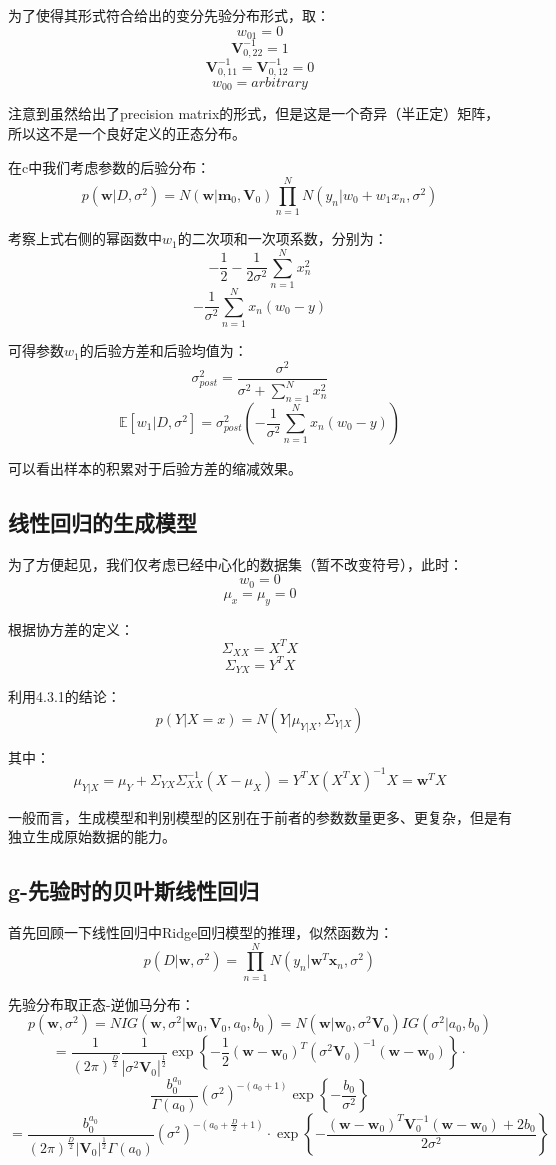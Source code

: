 \documentclass[UTF8]{ctexart}
\begin{document}
为了使得其形式符合给出的变分先验分布形式，取：
$$w_{01}=0$$
$$\textbf{V}_{0,22}^{-1}=1$$
$$\textbf{V}_{0,11}^{-1}=\textbf{V}_{0,12}^{-1}=0$$
$$w_{00}=arbitrary$$

注意到虽然给出了precision matrix的形式，但是这是一个奇异（半正定）矩阵，所以这不是一个良好定义的正态分布。

在c中我们考虑参数的后验分布：
$$p(\textbf{w}|D,\sigma^{2}) =N(\textbf{w}|\textbf{m}_{0},\textbf{V}_{0})\prod_{n=1}^{N}N(y_{n}|w_{0}+w_{1}x_{n},\sigma^{2})$$

考察上式右侧的幂函数中$w_{1}$的二次项和一次项系数，分别为：
$$-\frac{1}{2}-\frac{1}{2\sigma^{2}}\sum_{n=1}^{N}x_{n}^{2}$$
$$-\frac{1}{\sigma^{2}}\sum_{n=1}^{N}x_{n}(w_{0}-y)$$

可得参数$w_{1}$的后验方差和后验均值为：
$$\sigma^{2}_{post}=\frac{\sigma^{2}}{\sigma^{2}+\sum_{n=1}^{N}x_{n}^{2}}$$
$$\mathbb{E}[w_{1}|D,\sigma^{2}]=\sigma^{2}_{post}(-\frac{1}{\sigma^{2}}\sum_{n=1}^{N}x_{n}(w_{0}-y))$$

可以看出样本的积累对于后验方差的缩减效果。

\subsection{线性回归的生成模型}
为了方便起见，我们仅考虑已经中心化的数据集（暂不改变符号），此时：
$$w_{0}=0$$
$$\mu_{x}=\mu_{y}=0$$

根据协方差的定义：
$$\Sigma_{XX}=X^{T}X$$
$$\Sigma_{YX}=Y^{T}X$$

利用4.3.1的结论：
$$p(Y|X=x)=N(Y|\mu_{Y|X},\Sigma_{Y|X})$$

其中：
$$\mu_{Y|X}=\mu_{Y}+\Sigma_{YX}\Sigma_{XX}^{-1}(X-\mu_{X})=Y^{T}X(X^{T}X)^{-1}X=\textbf{w}^{T}X$$

一般而言，生成模型和判别模型的区别在于前者的参数数量更多、更复杂，但是有独立生成原始数据的能力。

\subsection{g-先验时的贝叶斯线性回归}
首先回顾一下线性回归中Ridge回归模型的推理，似然函数为：
$$p(D|\textbf{w},\sigma^{2})=\prod_{n=1}^{N}N(y_{n}|\textbf{w}^{T}\textbf{x}_{n},\sigma^{2})$$

先验分布取正态-逆伽马分布：
$$p(\textbf{w},\sigma^{2})=NIG(\textbf{w},\sigma^{2}|\textbf{w}_{0},\textbf{V}_{0},a_{0},b_{0})=N(\textbf{w}|\textbf{w}_{0},\sigma^{2}\textbf{V}_{0})IG(\sigma^{2}|a_{0},b_{0})$$
$$=\frac{1}{(2\pi)^{\frac{D}{2}}}\frac{1}{|\sigma^{2}\textbf{V}_{0}|^{\frac{1}{2}}}\exp\left\{ -\frac{1}{2}(\textbf{w}-\textbf{w}_{0})^{T}(\sigma^{2}\textbf{V}_{0})^{-1}(\textbf{w}-\textbf{w}_{0}) \right\} \cdot$$
$$\frac{b_{0}^{a_{0}}}{\Gamma(a_{0})}(\sigma^{2})^{-(a_{0}+1)}\exp\left\{ -\frac{b_{0}}{\sigma^{2}} \right\}$$
$$=\frac{b_{0}^{a_{0}}}{(2\pi)^{\frac{D}{2}}|\textbf{V}_{0}|^{\frac{1}{2}}\Gamma(a_{0})}(\sigma^{2})^{-(a_{0}+\frac{D}{2}+1)}\cdot\exp\left\{ -\frac{(\textbf{w}-\textbf{w}_{0})^{T}\textbf{V}_{0}^{-1}(\textbf{w}-\textbf{w}_{0})+2b_{0}}{2\sigma^{2}} \right\}$$
\end{document}
